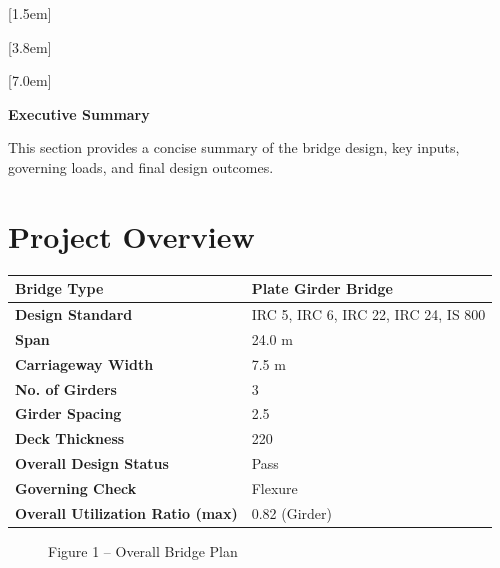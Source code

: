 \documentclass[12pt,a4paper]{report}
\numberwithin{table}{chapter}
\numberwithin{figure}{chapter}
\begin{document}
[1.5em]
  {\normalfont\vspace{2pt}}
  {\contentslabel{1.5em}}
  {\hspace*{-1.5em}}
  {\hfill\contentspage}

[3.8em]
  {\normalfont}
  {\contentslabel{2.3em}}
  {\hspace*{-2.3em}}
  {\hfill\contentspage}

[7.0em]
  {\normalfont}
  {\contentslabel{3.2em}}
  {\hspace*{-3.2em}}
  {\hfill\contentspage}

\newpage
\renewcommand{\contentsname}{\centering\Large\bfseries Table of Contents}
\tableofcontents


\newpage
{\centering\Large\bfseries Executive Summary\par}
\vspace{0.8em}

This section provides a concise summary of the bridge design, key inputs, governing loads, and final design outcomes.

\section*{Project Overview}
\label{sec:project-overview}


\begin{tabular}{|L{5.5cm}|L{8.5cm}|}
\hline
\textbf{Bridge Type} & Plate Girder Bridge \\
\hline
\textbf{Design Standard} & IRC 5, IRC 6, IRC 22, IRC 24, IS 800 \\
\hline
\textbf{Span} & 24.0 m \\
\hline
\textbf{Carriageway Width} & 7.5 m \\
\hline
\textbf{No. of Girders} & 3 \\
\hline
\textbf{Girder Spacing} & 2.5 \\
\hline
\textbf{Deck Thickness} & 220 \\
\hline
\textbf{Overall Design Status} & Pass \\
\hline
\textbf{Governing Check} & Flexure \\
\hline
\textbf{Overall Utilization Ratio (max)} & 0.82 (Girder) \\
\hline
\end{tabular}


\begin{figure}[H]
\centering
{}
\caption*{Figure 1 -- Overall Bridge Plan}
\end{figure}
\end{document}
